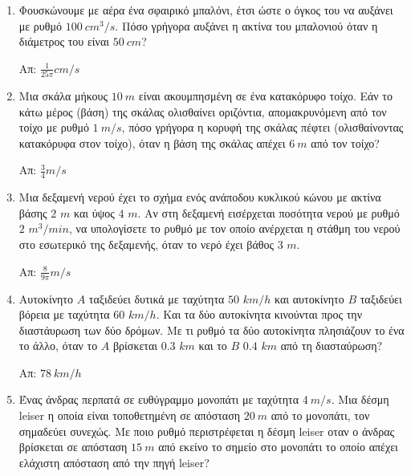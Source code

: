 







\pagestyle{empty}

\begin{center}
\end{center}

\vspace{\baselineskip}

\begin{enumerate}

	\item  Φουσκώνουμε με αέρα ένα σφαιρικό μπαλόνι, έτσι
		ώστε ο όγκος του να αυξάνει με ρυθμό $\SI{100}{cm^{3}\per s}$. Πόσο γρήγορα
		αυξάνει η ακτίνα του μπαλονιού όταν η διάμετρος του είναι $\SI{50}{cm}$?

		\hfill Απ: $\frac{1}{25\pi}\si{cm\per s}$


	\item  Μια σκάλα μήκους $\SI{10}{m}$ είναι ακουμπησμένη
		σε ένα κατακόρυφο τοίχο. Εάν το κάτω μέρος (βάση) της σκάλας ολισθαίνει
		οριζόντια, απομακρυνόμενη από τον τοίχο με ρυθμό $\SI{1}{m\per s}$, πόσο
		γρήγορα η κορυφή της σκάλας πέφτει (ολισθαίνοντας κατακόρυφα στον τοίχο), όταν η
		βάση της σκάλας απέχει $\SI{6}{m}$ από τον τοίχο?

		\hfill Απ: $\frac{3}{4}\si{m\per s}$

	\item  Μια δεξαμενή νερού έχει το σχήμα ενός ανάποδου
		κυκλικού κώνου με ακτίνα βάσης $2$ $\si{m}$ και ύψος $4$ $\si{m}$. Αν
		στη δεξαμενή εισέρχεται ποσότητα νερού με ρυθμό $2$ $\si{m^{3}/min}$, να
		υπολογίσετε το ρυθμό με τον οποίο ανέρχεται η στάθμη του νερού στο εσωτερικό της
		δεξαμενής, όταν το νερό έχει βάθος $3$ $\si{m}$.

		\hfill Απ: $\frac{8}{9\pi}\si{m\per s}$

	\item   Αυτοκίνητο $A$ ταξιδεύει δυτικά με ταχύτητα $50$
		$\si{km\per h}$ και αυτοκίνητο $B$ ταξιδεύει βόρεια με ταχύτητα $60$
		$\si{km/h}$. Και τα δύο αυτοκίνητα κινούνται προς την διαστάυρωση των δύο δρόμων. Με τι ρυθμό τα δύο αυτοκίνητα πλησιάζουν το ένα το άλλο, όταν το $A$ βρίσκεται $0.3$ $\si{km}$ και το $B$ $0.4$ $\si{km}$ από τη διασταύρωση?

		\hfill Απ: $\SI{78}{km/h}$

	\item  Ένας άνδρας περπατά σε ευθύγραμμο μονοπάτι με
		ταχύτητα $\SI{4}{m/s}$. Μια δέσμη \textlatin{leiser} η οποία είναι τοποθετημένη σε απόσταση $\SI{20}{m}$ από το μονοπάτι, τον σημαδεύει συνεχώς. Με ποιο ρυθμό περιστρέφεται η δέσμη \textlatin{leiser} οταν ο άνδρας βρίσκεται σε απόσταση $\SI{15}{m}$ από εκείνο το σημείο στο μονοπάτι το οποίο απέχει ελάχιστη απόσταση από την πηγή \textlatin{leiser}?


\end{enumerate}
